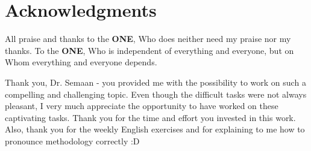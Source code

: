 
\chapter*{Acknowledgments}

All praise and thanks to the \textbf{ONE}, Who does neither need my praise nor my thanks. 
To the \textbf{ONE}, Who is independent of everything and everyone, but on Whom everything and everyone depends.

\vspace{1cm}
Thank you, Dr. Semaan - you provided me with the possibility to work on such a compelling and challenging topic. Even though the difficult tasks were not always pleasant, I very much appreciate the opportunity to have worked on these captivating tasks. 
Thank you for the time and effort you invested in this work.
Also, thank you for the weekly English exercises and for explaining to me how to pronounce methodology correctly :D 

